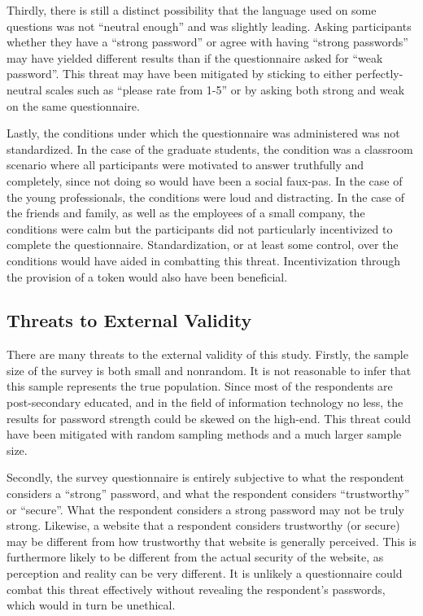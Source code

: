 \documentclass[letterpaper, 10 pt, conference]{ieeeconf}  %
\begin{document}
Thirdly, there is still a distinct possibility that the language used on some questions was not “neutral enough” and was slightly leading. Asking participants whether they have a “strong password” or agree with having “strong passwords” may have yielded different results than if the questionnaire asked for “weak password”. This threat may have been mitigated by sticking to either perfectly-neutral scales such as “please rate from 1-5” or by asking both strong and weak on the same questionnaire.

Lastly, the conditions under which the questionnaire was administered was not standardized. In the case of the graduate students, the condition was a classroom scenario where all participants were motivated to answer truthfully and completely, since not doing so would have been a social faux-pas. In the case of the young professionals, the conditions were loud and distracting. In the case of the friends and family, as well as the employees of a small company, the conditions were calm but the participants did not particularly incentivized to complete the questionnaire. Standardization, or at least some control, over the conditions would have aided in combatting this threat. Incentivization through the provision of a token would also have been beneficial.

\subsection{Threats to External Validity}\label{sec:externalvalidity}

There are many threats to the external validity of this study. Firstly, the sample size of the survey is both small and nonrandom. It is not reasonable to infer that this sample represents the true population. Since most of the respondents are post-secondary educated, and in the field of information technology no less, the results for password strength could be skewed on the high-end. This threat could have been mitigated with random sampling methods and a much larger sample size.

Secondly, the survey questionnaire is entirely subjective to what the respondent considers a “strong” password, and what the respondent considers “trustworthy” or “secure”. What the respondent considers a strong password may not be truly strong. Likewise, a website that a respondent considers trustworthy (or secure) may be different from how trustworthy that website is generally perceived. This is furthermore likely to be different from the actual security of the website, as perception and reality can be very different. It is unlikely a questionnaire could combat this threat effectively without revealing the respondent’s passwords, which would in turn be unethical. 
\end{document}
